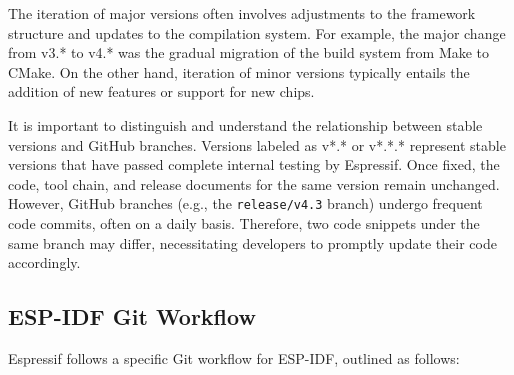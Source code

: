 \documentclass[a4paper,12pt]{book}
\begin{document}
The iteration of major versions often involves adjustments to the framework structure and updates to the compilation system. For example, the major change from v3.* to v4.* was the gradual migration of the build system from Make to CMake. On the other hand, iteration of minor versions typically entails the addition of new features or support for new chips.

It is important to distinguish and understand the relationship between stable versions and GitHub branches. Versions labeled as v*.* or v*.*.* represent stable versions that have passed complete internal testing by Espressif. Once fixed, the code, tool chain, and release documents for the same version remain unchanged. However, GitHub branches (e.g., the \verb|release/v4.3| branch) undergo frequent code commits, often on a daily basis. Therefore, two code snippets under the same branch may differ, necessitating developers to promptly update their code accordingly.

\subsection{ESP-IDF Git Workflow}

Espressif follows a specific Git workflow for ESP-IDF, outlined as follows:
\end{document}
